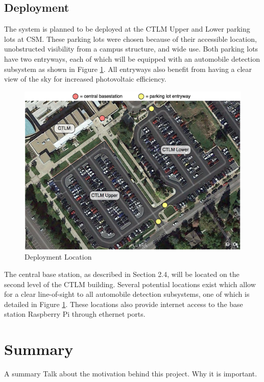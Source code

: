 \documentclass[11pt, oneside, fullpage, doublespace]{article}
\begin{document}
\subsection{Deployment}
The system is planned to be deployed at the CTLM Upper and Lower parking lots at CSM. These parking lots were chosen because of their accessible location, unobstructed visibility from a campus structure, and wide use. Both parking lots have two entryways, each of which will be equipped with an automobile detection subsystem as shown in Figure \ref{fig:deployment}. All entryways also benefit from having a clear view of the sky for increased photovoltaic efficiency.

\begin{figure}
\begin{center}
\includegraphics[width=5in]{deployment}
\end{center}
\caption{Deployment Location}
\label{fig:deployment}
\end{figure}

The central base station, as described in Section 2.4, will be located on the second level of the CTLM building. Several potential locations exist which allow for a clear line-of-sight to all automobile detection subsystems, one of which is detailed in Figure \ref{fig:deployment}. These locations also provide internet access to the base station Raspberry Pi through ethernet ports.


\section{Summary}
A summary \cite{johnson2012} Talk about the motivation behind this project. Why it is important.
\end{document}
